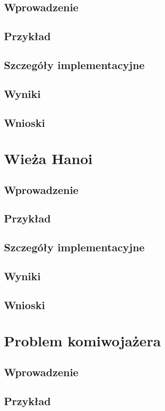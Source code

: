     \subsection{Wprowadzenie}
    \subsection{Przykład}
    \subsection{Szczegóły implementacyjne}
    \subsection{Wyniki}
    \subsection{Wnioski}
\section{Wieża Hanoi}
    \subsection{Wprowadzenie}
    \subsection{Przykład}
    \subsection{Szczegóły implementacyjne}
    \subsection{Wyniki}
    \subsection{Wnioski}
\section{Problem komiwojażera}
    \subsection{Wprowadzenie}
    \subsection{Przykład}

